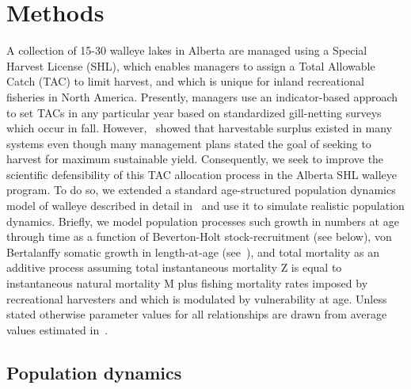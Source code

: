 \documentclass[floatfix,nofootinbib,longbibliography,notitlepage]{revtex4-2}
\begin{document}
%
%
%
\section{Methods}
\label{sec:methods}

A collection of 15-30 walleye lakes in Alberta are managed using a Special Harvest License (SHL), which enables managers to assign a Total Allowable Catch (TAC) to limit harvest, and which is unique for inland recreational fisheries in North America.  
Presently, managers use an indicator-based approach to set TACs in any particular year based on standardized gill-netting surveys which occur in fall.  
However,~\cite{cahill2022} showed that harvestable surplus existed in many systems even though many management plans stated the goal of seeking to harvest  for maximum sustainable yield.  
Consequently, we seek to improve the scientific defensibility of this TAC allocation process in the Alberta SHL walleye program. 
To do so, we extended a standard age-structured population dynamics model of walleye described in detail in~\cite{cahill2022} and use it to simulate realistic population dynamics.  
Briefly, we model population processes such growth in numbers at age through time as a function of Beverton-Holt stock-recruitment (see below), von Bertalanffy somatic growth in length-at-age (see~\cite{cahill2020spatial}), and total mortality as an additive process assuming total instantaneous mortality Z is equal to instantaneous natural mortality M plus fishing mortality rates imposed by recreational harvesters and which is modulated by vulnerability at age.  
Unless stated otherwise parameter values for all relationships are drawn from average values estimated in~\cite{cahill2020spatial}.

\subsection{Population dynamics}
\label{sec:popdyn}
\end{document}
